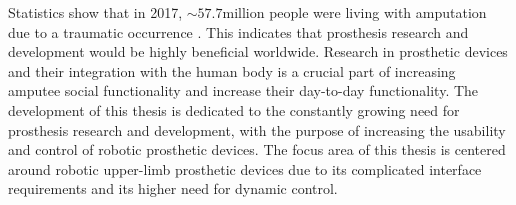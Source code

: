 \documentclass[../main.tex]{subfiles}
\begin{document}
Statistics show that in 2017, $\sim 57.7 \text{million}$ people were living with amputation due to a \gls{traumatic} occurrence \cite{McDonald2020}.
This indicates that prosthesis research and development would be highly beneficial worldwide.
Research in prosthetic devices and their integration with the human body is a crucial part of increasing amputee social functionality and increase their day-to-day functionality.
The development of this thesis is dedicated to the constantly growing need for prosthesis research and development, with the purpose of increasing the usability and control of robotic prosthetic devices.
The focus area of this thesis is centered around robotic upper-limb prosthetic devices due to its complicated interface requirements and its higher need for dynamic control.
\end{document}
